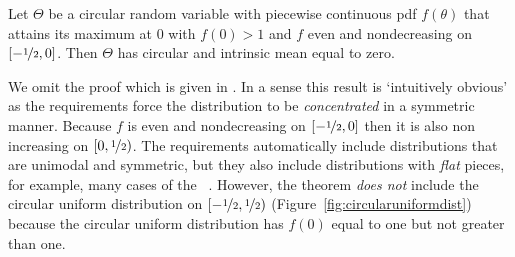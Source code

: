 \documentclass[journal]{../bib/IEEEtran}
\begin{document}
\begin{theorem}\label{thm:unimean}
Let $\Theta$ be a circular random variable with piecewise continuous pdf $f(\theta)$ that attains its maximum at $0$ with $f(0) > 1$ and $f$ even and nondecreasing on $[-\nicefrac{1}{2}, 0]$. Then $\Theta$ has circular and intrinsic mean equal to zero.\end{theorem}
We omit the proof which is given in \cite[p.~74]{McKilliam2010thesis}. In a sense this result is `intuitively obvious' as the requirements force the distribution to be \emph{concentrated} in a symmetric manner.  Because $f$ is even and nondecreasing on $[-\nicefrac{1}{2}, 0]$ then it is also non increasing on $[0, \nicefrac{1}{2})$. %
The requirements automatically include distributions that are unimodal and symmetric, but they also include distributions with \emph{flat} pieces, for example, many cases of the  \cite{Mardia_directional_statistics,Fisher1993}~\cite[Sec. 5.5]{McKilliam2010thesis}.  However, the theorem \emph{does not} include the circular uniform distribution on $[-\nicefrac{1}{2}, \nicefrac{1}{2})$ (Figure~\ref{fig:circularuniformdist}) because the circular uniform distribution has $f(0)$ equal to one but not greater than one.  %


\end{document}
